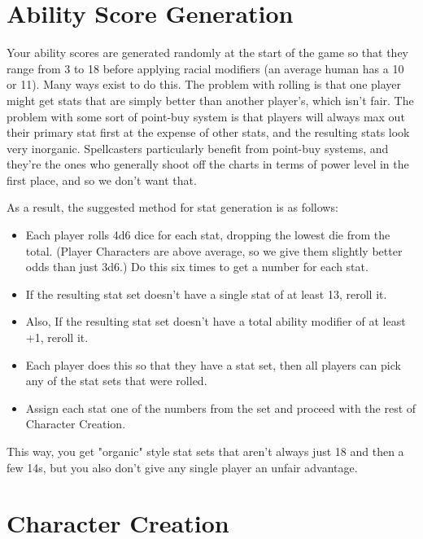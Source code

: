 \section{Ability Score Generation}

Your ability scores are generated randomly at the start of the game so that they range from 3 to 18 before applying racial modifiers (an average human has a 10 or 11). Many ways exist to do this. The problem with rolling is that one player might get stats that are simply better than another player's, which isn't fair. The problem with some sort of point-buy system is that players will always max out their primary stat first at the expense of other stats, and the resulting stats look very inorganic. Spellcasters particularly benefit from point-buy systems, and they're the ones who generally shoot off the charts in terms of power level in the first place, and so we don't want that.

As a result, the suggested method for stat generation is as follows:
\begin{itemize}
\item Each player rolls 4d6 dice for each stat, dropping the lowest die from the total. (Player Characters are above average, so we give them slightly better odds than just 3d6.) Do this six times to get a number for each stat.
\item If the resulting stat set doesn't have a single stat of at least 13, reroll it.
\item Also, If the resulting stat set doesn't have a total ability modifier of at least +1, reroll it.
\item Each player does this so that they have a stat set, then all players can pick any of the stat sets that were rolled.
\item Assign each stat one of the numbers from the set and proceed with the rest of Character Creation.
\end{itemize}
This way, you get "organic" style stat sets that aren't always just 18 and then a few 14s, but you also don't give any single player an unfair advantage.

\section{Character Creation}

